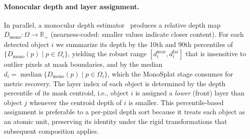 \paragraph{Monocular depth and layer assignment.}
In parallel, a monocular depth
estimator~\cite{yang2024depthanything} produces a relative depth map
$D_{\mathrm{mono}} : \Omega \to \mathbb{R}_{+}$ (nearness-coded: smaller
values indicate closer content). For each detected object $i$ we
summarize its depth by the 10th and 90th percentiles of
$\{D_{\mathrm{mono}}(p) \mid p \in \Omega_i\}$, yielding the robust
range $[d_i^{\mathrm{near}}, d_i^{\mathrm{far}}]$ that is insensitive
to outlier pixels at mask boundaries, and by the median
$d_i = \operatorname{median}\{D_{\mathrm{mono}}(p) \mid p \in
\Omega_i\}$, which the MonoSplat stage consumes for metric recovery.
The layer index of each object is determined by the depth percentile of
its mask centroid, i.e., object $i$ is assigned a \emph{lower} (front)
layer than object $j$ whenever the centroid depth of $i$ is smaller.
This percentile-based assignment is preferable to a per-pixel depth
sort because it treats each object as an atomic unit, preserving its
identity under the rigid transformations that subsequent composition
applies.

